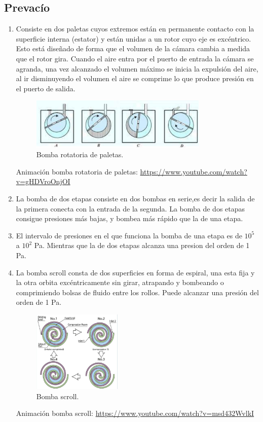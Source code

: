 \subsection{Prevacío}
\begin{enumerate}[resume]
    \item %
    Consiste en dos paletas cuyos extremos están en permanente contacto con la superficie interna (estator) y están  unidas a un rotor cuyo eje es excéntrico. Esto está diseñado de forma que el volumen de la cámara cambia a medida que el rotor gira. Cuando el aire entra por el puerto de entrada la cámara se agranda, una vez alcanzado el volumen máximo  se inicia la expulsión del aire, al ir disminuyendo el volumen el aire se comprime lo que produce presión en el puerto de salida.
    \begin{figure}
        \centering
        \includegraphics[width=0.8\textwidth]{Imagenes/Unidad/U2/pregunta 25.jpg}
        \caption{Bomba rotatoria de paletas.  }
        \label{pregunta 25}
    \end{figure}
     Animación bomba rotatoria de paletas: \url{https://www.youtube.com/watch?v=gHDVroOnjOI}
    \item %
    La bomba de dos etapas consiste en dos bombas en serie,es decir la salida de la primera conecta con la entrada de la segunda. La bomba de dos etapas consigue presiones más bajas, y bombea más rápido que la de una etapa.
    \item %
    El intervalo de presiones en el que funciona la bomba de una etapa es de $\mathrm{10^5}$ a $\mathrm{10^{2}}$ Pa. Mientras que la de dos etapas alcanza una presion del orden de 1 Pa. 
    \item %
     La bomba scroll consta de dos superficies en forma de espiral, una esta fija y la otra orbita excéntricamente sin girar, atrapando y bombeando o comprimiendo bolsas de fluido entre los rollos. Puede alcanzar una presión del orden de 1 Pa.
     \begin{figure}
         \centering
         \includegraphics[width=0.4\textwidth]{Imagenes/Unidad/U2/pregunta 28.jpg}
         \caption{Bomba scroll.}
         \label{fig:my_label}
     \end{figure}
     Animación bomba scroll: \url{https://www.youtube.com/watch?v=msd432WvlkI}
\end{enumerate}


